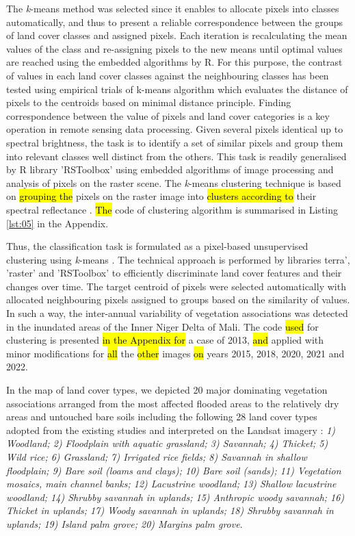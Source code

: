 \documentclass[12pt,a4paper,oneside]{article}
\def \newpar{\vspace{6pt}}
\begin{document}
\newpar The \emph{k}-means method was selected since it enables to allocate pixels into classes automatically, and thus to present a reliable correspondence between the groups of land cover classes and assigned pixels. Each iteration is recalculating the mean values of the class and re-assigning pixels to the new means until optimal values are reached using the embedded algorithms by R. For this purpose, the contrast of values in each land cover classes against the neighbouring classes has been tested using empirical trials of k-means algorithm which evaluates the distance of pixels to the centroids based on minimal distance principle. Finding correspondence between the value of pixels and land cover categories is a key operation in remote sensing data processing. Given several pixels identical up to spectral brightness, the task is to identify a set of similar pixels and group them into relevant classes well distinct from the others. This task is readily generalised by R library 'RSToolbox' using embedded algorithms of image processing and analysis of pixels on the raster scene. The \emph{k}-means clustering technique is based on \hl{grouping the} pixels on the raster image into \hl{clusters according to }their spectral reflectance \citep{Richards2022,OSE201657}. \hl{The} code of clustering algorithm is summarised in Listing \ref{lst:05} in the Appendix.

\newpar Thus, the classification task is formulated as a pixel-based unsupervised clustering using \emph{k}-means \citep{Sreevalsan}. The technical approach is performed by libraries terra', 'raster' and 'RSToolbox' to efficiently discriminate land cover features and their changes over time. The target centroid of pixels were selected automatically with allocated neighbouring pixels assigned to groups based on the similarity of values. In such a way, the inter-annual variability of vegetation associations was detected in the inundated areas of the Inner Niger Delta of Mali. The code \hl{used} for clustering is presented \hl{in the Appendix for} a case of 2013, \hl{and }applied with minor modifications for \hl{all }the \hl{other }images \hl{on} years\hl{ }2015, 2018, 2020, 2021 and 2022.

\newpar In the map of land cover types, we depicted 20 major dominating vegetation associations arranged from the most affected flooded areas to the relatively dry areas and untouched bare soils including the following 28 land cover types adopted from the existing studies and interpreted on the Landsat imagery \cite{Marie}: \emph{1) Woodland; 2) Floodplain with aquatic grassland; 3) Savannah; 4) Thicket; 5) Wild rice; 6) Grassland; 7) Irrigated rice fields; 8) Savannah in shallow floodplain; 9) Bare soil (loams and clays); 10) Bare soil (sands); 11) Vegetation mosaics, main channel banks; 12) Lacustrine woodland; 13) Shallow lacustrine woodland; 14) Shrubby savannah in uplands; 15) Anthropic woody savannah; 16) Thicket in uplands; 17) Woody savannah in uplands; 18) Shrubby savannah in uplands; 19) Island palm grove; 20) Margins palm grove}.
\end{document}
